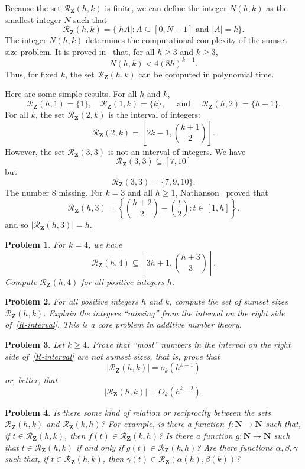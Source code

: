 \documentclass{amsart}
\newtheorem{problem}{Problem}
\newcommand{\bprob}{\begin{problem}}
\newcommand{\eprob}{\end{problem}}
\newcommand{\beq}{\begin{equation}}
\newcommand{\eeq}{\end{equation}}
\newcommand{\N}{\ensuremath{ \mathbf N }}
\newcommand{\Z}{\ensuremath{\mathbf Z}}
\newcommand{\mcr}{\ensuremath{ \mathcal R}}
\DeclareMathOperator{\qand}{\quad\text{and}\quad}
\begin{document}
Because the set $\mcr_{\Z}(h,k)$ is finite, we can define the 
integer $N(h,k)$ as the smallest integer $N$ such that 
\[  
\mcr_{\Z}(h,k) = \{ |hA|: A \subseteq [0,N-1] \text{ and } |A| = k \}.
\]
The integer $N(h,k)$ determines the computational complexity of the 
sumset size problem.  It is proved in~\cite{nath2505b} 
that, for all $h \geq 3$ and $k \geq 3$,
\beq         \label{complexity}
N(h,k) < 4(8h)^{k-1}.
\eeq
Thus, for fixed $k$, the set $\mcr_{\Z}(h,k)$ can be computed in polynomial time. 


Here are some simple results. 
For all $h$ and $k$, 
\[
\mcr_{\Z}(h,1) = \{1\}, \quad \mcr_{\Z}(1,k) = \{k\}, 
\qand
\mcr_{\Z}(h,2) = \{h+1\}.
\]
For all $k$, the set $\mcr_{\Z}(2,k)$ is the interval of integers:
\[
\mcr_{\Z}(2,k) = \left[ 2k-1, \binom{k+1}{2} \right]. 
\]
However, the set $\mcr_{\Z}(3,3)$ is not an interval of integers. We have 
\[
\mcr_{\Z}(3,3) \subseteq \left[ 7, 10 \right] 
\]
but 
\[
\mcr_{\Z}(3,3) = \{7,9,10\}.
\]
The number 8 missing.  For $k=3$ and all $h \geq 1$, 
Nathanson~\cite{nath25bb} proved that  
\[
\mcr_{\Z}(h,3) = \left\{  \binom{h+2}{2}  -  \binom{t}{2} : t \in [1,h] \right\}. 
\]
and so $|\mcr_{\Z}(h,3)| = h$. 


\bprob
For  $k=4$, we have 
\[
\mcr_{\Z}(h,4) \subseteq \left[ 3h+1, \binom{h+3}{3} \right].
\]
Compute $\mcr_{\Z}(h,4)$ for all positive integers $h$.   
\eprob



\bprob
For all positive integers $h$ and $k$,  
compute the set of sumset sizes $\mcr_{\Z}(h,k)$.  
Explain the  integers ``missing'' from the interval 
on the right side of~\eqref{R-interval}.  
This is a core problem in additive number theory.  
\eprob




\bprob
 Let $k \geq 4$.  
Prove that ``most'' numbers in the interval 
on the right side of~\eqref{R-interval} 
are \emph{not} sumset sizes, that is, 
prove that 
\[
\left| \mcr_{\Z}(h,k) \right|= o_k \left( h^{k-1} \right)
\]
or, better, that 
\[
\left| \mcr_{\Z}(h,k) \right|= O_k\left( h^{k-2} \right). 
\]
\eprob

\bprob
Is there some kind of relation or reciprocity 
between the sets $\mcr_{\Z}(h,k)$ 
and $\mcr_{\Z}(k,h)$?  For example, is there a function $f: \N \rightarrow \N$ 
such that, if $t \in \mcr_{\Z}(h,k)$, then $f(t) \in \mcr_{\Z}(k,h)$? 
Is there a function $g: \N \rightarrow \N$ 
such that $t \in \mcr_{\Z}(h,k)$ if and only if $g(t) \in \mcr_{\Z}(k,h)$? 
Are there  functions $\alpha,\beta,\gamma$ such that, 
if $t \in \mcr_{\Z}(h,k)$, then $\gamma(t) \in \mcr_{\Z}(\alpha(h), \beta(k))$? 
\eprob
\end{document}
